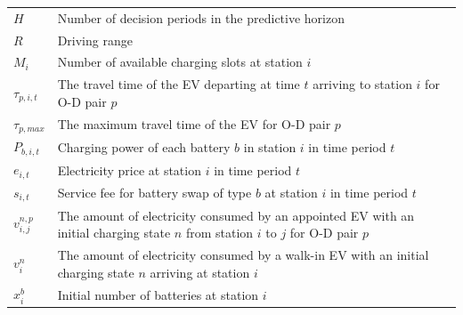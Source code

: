\documentclass[12pt,hyperref,a4paper,UTF8]{ctexart}
\begin{document}
\begin{table}[!htbp]
\begin{tabular}{@{}lp{13cm}@{}}
    $H$ & Number of decision periods in the predictive horizon \\
    $R$ & Driving range \\
    $M_i$ & Number of available charging slots at station $i$ \\
    $\tau_{p,i,t}$ & The travel time of the EV departing at time $t$ arriving to station $i$ for O-D pair $p$\\
    $\tau_{p,max}$ & The maximum travel time of the EV for O-D pair $p$\\
    $P_{b,i,t}$ & Charging power of each battery $b$ in station $i$ in time period $t$\\
    $e_{i,t}$ & Electricity price at station $i$ in time period $t$\\
    $s_{i,t}$ & Service fee for battery swap of type $b$ at station $i$ in time period $t$\\
    $v^{n,p}_{i,j}$ & The amount of electricity consumed by an appointed EV with an initial charging state $n$ from station $i$ to $j$ for O-D pair $p$\\
    $v^{n}_{i}$ & The amount of electricity consumed by a walk-in EV with an initial charging state $n$ arriving at station $i$\\
    $x_i^b$ & Initial number of batteries at station $i$ \\

\end{tabular}
\end{table}
\end{document}

